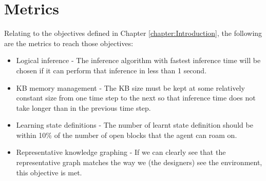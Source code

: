 
\section{Metrics}
Relating to the objectives defined in Chapter \ref{chapter:Introduction}, the following are the metrics to reach those objectives:

\begin{itemize}
 \item Logical inference - The inference algorithm with fastest inference time will be chosen if it can perform that inference in less than 1 second.
 \item KB memory management - The KB size must be kept at some relatively constant size from one time step to the next so that inference time does not take longer than in the previous time step.
 \item Learning state definitions - The number of learnt state definition should be within 10\% of the number of open blocks that the agent can roam on.
 \item Representative knowledge graphing - If we can clearly see that the representative graph matches the way we (the designers) see the environment, this objective is met.
\end{itemize}

